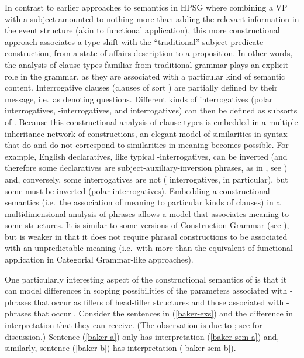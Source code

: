 \documentclass[output=paper]{langsci/langscibook}
\begin{document}
In contrast to earlier approaches to semantics in HPSG where combining a VP with a subject amounted to nothing more than adding the relevant information in the event structure (akin to functional application), this more constructional approach associates a type-shift with the ``traditional'' subject-predicate construction, from a state of affairs description to a proposition. In other words, the analysis of clause types familiar from traditional grammar plays an explicit role in the grammar, as they are associated  with a particular kind of semantic content.  Interrogative clauses (clauses of sort ) are partially defined by their message, i.e.\ as denoting questions. Different kinds of interrogatives (polar interrogatives, -interrogatives, and  interrogatives) can then be defined as subsorts of . Because this constructional analysis of clause types is embedded in a multiple inheritance network of constructions, an elegant model of similarities in syntax that do and do not correspond to similarities in meaning becomes possible. For example, English declaratives, like typical -interrogatives, can be inverted (and therefore some declaratives are subject-auxiliary-inversion phrases, as in , see \citealt{Fillmore1999}) and, conversely, some interrogatives are not ( interrogatives, in particular), but some must be inverted (polar interrogatives). Embedding a constructional semantics (i.e.\ the association of meaning to particular kinds of clauses) in a multidimensional analysis of phrases allows a model that associates meaning to some structures.
It is similar to some versions of Construction Grammar (see ), but is weaker in that it does not require phrasal constructions to be associated with an unpredictable meaning (i.e.\ with more than the equivalent of functional application in Categorial Grammar-like approaches). 

One particularly interesting aspect of the constructional semantics of \citet{GinzburgandSag2001} is that it can model differences in scoping possibilities of the parameters associated with -phrases that occur as fillers of head-filler structures and those associated with -phrases that occur . Consider the sentences in (\ref{baker-exs}) and the difference in interpretation that they can receive. (The observation is due to \citealt{Baker1970a}; see \citealt[242--246]{GinzburgandSag2001} for discussion.) Sentence (\ref{baker-a}) only has interpretation (\ref{baker-sem-a}) and, similarly, sentence (\ref{baker-b}) has interpretation (\ref{baker-sem-b}).
\end{document}
